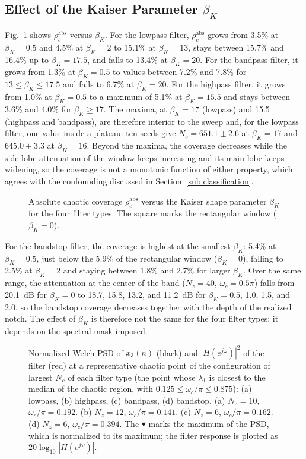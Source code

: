 \documentclass[journal]{IEEEtran}
\begin{document}
\subsection{Effect of the Kaiser Parameter $\beta_K$}\label{sub:beta}
Fig.~\ref{fig:beta} shows $\rho_c^\text{abs}$ versus $\beta_K$. For the lowpass
filter, $\rho_c^\text{abs}$ grows from 3.5\% at $\beta_K=0.5$ and 4.5\% at
$\beta_K=2$ to 15.1\% at $\beta_K=13$, stays between 15.7\% and 16.4\% up to
$\beta_K=17.5$, and falls to 13.4\% at $\beta_K=20$. For the bandpass filter,
it grows from 1.3\% at $\beta_K=0.5$ to values between 7.2\% and 7.8\% for
$13\le\beta_K\le17.5$ and falls to 6.7\% at $\beta_K=20$. For the highpass
filter, it grows from 1.0\% at $\beta_K=0.5$ to a maximum of 5.1\% at
$\beta_K=15.5$ and stays between 3.6\% and 4.0\% for $\beta_K\ge17$.
The maxima, at $\beta_K=17$ (lowpass) and 15.5 (highpass and bandpass), are
therefore interior to the sweep and, for the lowpass filter, one value inside a
plateau: ten seeds give $N_c=651.1\pm2.6$ at $\beta_K=17$ and $645.0\pm3.3$ at
$\beta_K=16$. Beyond the maxima, the coverage decreases while the side-lobe
attenuation of the window keeps increasing and its main lobe keeps widening, so
the coverage is not a monotonic function of either property, which agrees with
the confounding discussed in Section~\ref{sub:classification}. \begin{figure}[!t]
\centering

\caption{Absolute chaotic coverage $\rho_c^{\text{abs}}$ versus the Kaiser
shape parameter $\beta_K$ for the four filter types. The square marks the
rectangular window ($\beta_K=0$).}
\label{fig:beta}
\end{figure}

For the bandstop filter, the coverage is highest at the smallest $\beta_K$:
5.4\% at $\beta_K=0.5$, just below the 5.9\% of the rectangular window
($\beta_K=0$), falling to 2.5\% at $\beta_K=2$ and staying between 1.8\% and
2.7\% for larger $\beta_K$. Over the same range, the attenuation at the center
of the band ($N_z=40$, $\omega_c=0.5\pi$) falls from 20.1~dB for $\beta_K=0$ to
18.7, 15.8, 13.2, and 11.2~dB for $\beta_K=0.5$, 1.0, 1.5, and 2.0, so the
bandstop coverage decreases together with the depth of the realized notch. The
effect of $\beta_K$ is therefore not the same for the four filter types; it
depends on the spectral mask imposed.

\begin{figure}[!t]
\centering

\caption{Normalized Welch PSD of $x_3(n)$ (black) and $|H(e^{j\omega})|^2$ of
the filter (red) at a representative chaotic point of the configuration of
largest $N_c$ of each filter type (the point whose $\lambda_1$ is closest to
the median of the chaotic region, with
$0.125\le\omega_c/\pi\le0.875$): (a) lowpass, (b) highpass, (c) bandpass,
(d) bandstop. (a) $N_z=10$, $\omega_c/\pi=0.192$. (b) $N_z=12$,
$\omega_c/\pi=0.141$. (c) $N_z=6$, $\omega_c/\pi=0.162$. (d) $N_z=6$,
$\omega_c/\pi=0.394$. The $\blacktriangledown$ marks the maximum of the PSD,
which is normalized to its maximum; the filter response is plotted as
$20\log_{10}|H(e^{j\omega})|$.}
\label{fig:psd}
\end{figure}
\end{document}
